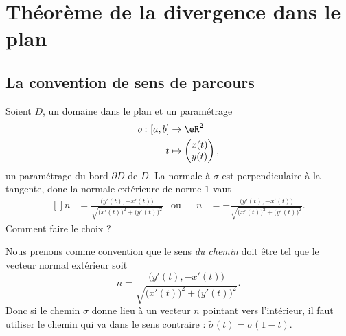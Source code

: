 \section{Théorème de la divergence dans le plan}

\subsection{La convention de sens de parcours}

Soient \( D\), un domaine dans le plan et un paramétrage
\begin{equation}
	\begin{aligned}
		\sigma\colon \mathopen[ a , b \mathclose] & \to \eR^2              \\
		t                                         & \mapsto \begin{pmatrix}
			                                                    x(t) \\
			                                                    y(t)
		                                                    \end{pmatrix},
	\end{aligned}
\end{equation}
un paramétrage du bord \( \partial D\) de \( D\). La normale à \( \sigma\) est perpendiculaire à la tangente, donc la normale extérieure de norme \( 1\) vaut
\begin{equation}
	\begin{aligned}[]
		n & =\frac{ \big( y'(t),-x'(t) \big) }{ \sqrt{ \big( x'(t)\big)^2+\big( y'(t) \big)^2  } } & \text{ou} &  & n & =-\frac{ \big( y'(t),-x'(t) \big) }{ \sqrt{ \big( x'(t)\big)^2+\big( y'(t) \big)^2  } }.
	\end{aligned}
\end{equation}
Comment faire le choix ?

Nous prenons comme convention que le sens \emph{du chemin} doit être tel que le vecteur normal extérieur soit
\begin{equation}
	n=\frac{ \big( y'(t),-x'(t) \big) }{ \sqrt{ \big( x'(t)\big)^2+\big( y'(t) \big)^2  } }.
\end{equation}
Donc si le chemin \( \sigma\) donne lieu à un vecteur \( n\) pointant vers l'intérieur, il faut utiliser le chemin qui va dans le sens contraire : \( \tilde \sigma(t)=\sigma(1-t)\).

